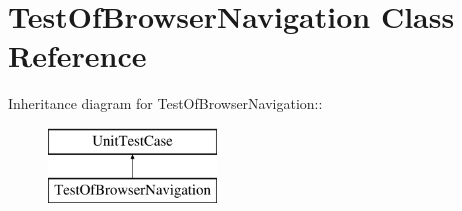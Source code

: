 \hypertarget{class_test_of_browser_navigation}{
\section{TestOfBrowserNavigation Class Reference}
\label{class_test_of_browser_navigation}
}
Inheritance diagram for TestOfBrowserNavigation::\begin{figure}[H]
\begin{center}
\leavevmode
\includegraphics[height=2cm]{class_test_of_browser_navigation}
\end{center}
\end{figure}
